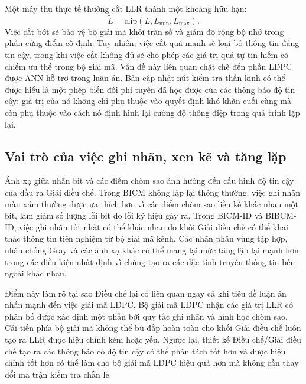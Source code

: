 Một máy thu thực tế thường cắt LLR thành một khoảng hữu hạn:
\begin{equation}
  \tilde{L}=\mathrm{clip}(L,L_{\min},L_{\max}).
\end{equation}
Việc cắt bớt sẽ bảo vệ bộ giải mã khỏi tràn số và giảm độ rộng bộ nhớ trong phần cứng điểm cố định. Tuy nhiên, việc cắt quá mạnh sẽ loại bỏ thông tin đáng tin cậy, trong khi việc cắt không đủ sẽ cho phép các giá trị quá tự tin hiếm có chiếm ưu thế trong bộ giải mã. Vấn đề này liên quan chặt chẽ đến phần LDPC được ANN hỗ trợ trong luận án. Bản cập nhật nút kiểm tra thần kinh có thể được hiểu là một phép biến đổi phi tuyến đã học được của các thông báo độ tin cậy; giá trị của nó không chỉ phụ thuộc vào quyết định khó khăn cuối cùng mà còn phụ thuộc vào cách nó định hình lại cường độ thông điệp trong quá trình lặp lại.

\subsection{Vai trò của việc ghi nhãn, xen kẽ và tăng lặp}
Ánh xạ giữa nhãn bit và các điểm chòm sao ảnh hưởng đến cấu hình độ tin cậy của đầu ra Giải điều chế. Trong BICM không lặp lại thông thường, việc ghi nhãn màu xám thường được ưa thích hơn vì các điểm chòm sao liền kề khác nhau một bit, làm giảm số lượng lỗi bit do lỗi ký hiệu gây ra. Trong BICM-ID và BIBCM-ID, việc ghi nhãn tốt nhất có thể khác nhau do khối Giải điều chế có thể khai thác thông tin tiên nghiệm từ bộ giải mã kênh. Các nhãn phân vùng tập hợp, nhãn chống Gray và các ánh xạ khác có thể mang lại mức tăng lặp lại mạnh hơn trong các điều kiện nhất định vì chúng tạo ra các đặc tính truyền thông tin bên ngoài khác nhau.

Điểm này làm rõ tại sao Điều chế lại có liên quan ngay cả khi tiêu đề luận án nhấn mạnh đến việc giải mã LDPC. Bộ giải mã LDPC nhận các giá trị LLR có phân bố được xác định một phần bởi quy tắc ghi nhãn và hình học chòm sao. Cải tiến phía bộ giải mã không thể bù đắp hoàn toàn cho khối Giải điều chế luôn tạo ra LLR được hiệu chỉnh kém hoặc yếu. Ngược lại, thiết kế Điều chế/Giải điều chế tạo ra các thông báo có độ tin cậy có thể phân tách tốt hơn và được hiệu chỉnh tốt hơn có thể làm cho bộ giải mã LDPC hiệu quả hơn mà không cần thay đổi ma trận kiểm tra chẵn lẻ.

